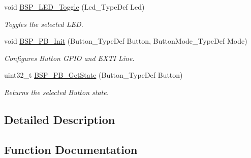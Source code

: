 \begin{DoxyCompactItemize}
void \mbox{\hyperlink{group___s_t_m32_f4___d_i_s_c_o_v_e_r_y___l_o_w___l_e_v_e_l___exported___functions_ga1b9eabba7d498f41d6f16587ec0f9732}{B\+S\+P\+\_\+\+L\+E\+D\+\_\+\+Toggle}} (Led\+\_\+\+Type\+Def Led)
\begin{DoxyCompactList}\small\item\em Toggles the selected L\+ED. \end{DoxyCompactList}\item 
void \mbox{\hyperlink{group___s_t_m32_f4___d_i_s_c_o_v_e_r_y___l_o_w___l_e_v_e_l___exported___functions_gaeece1cd3a2156a50bfa81638a27a1143}{B\+S\+P\+\_\+\+P\+B\+\_\+\+Init}} (Button\+\_\+\+Type\+Def Button, Button\+Mode\+\_\+\+Type\+Def Mode)
\begin{DoxyCompactList}\small\item\em Configures Button G\+P\+IO and E\+X\+TI Line. \end{DoxyCompactList}\item 
uint32\+\_\+t \mbox{\hyperlink{group___s_t_m32_f4___d_i_s_c_o_v_e_r_y___l_o_w___l_e_v_e_l___exported___functions_ga8f0978b6cffda9c67266ddfdb3a0abf7}{B\+S\+P\+\_\+\+P\+B\+\_\+\+Get\+State}} (Button\+\_\+\+Type\+Def Button)
\begin{DoxyCompactList}\small\item\em Returns the selected Button state. \end{DoxyCompactList}\end{DoxyCompactItemize}


\subsection{Detailed Description}


\subsection{Function Documentation}
\mbox{\label{group___s_t_m32_f4___d_i_s_c_o_v_e_r_y___l_o_w___l_e_v_e_l___exported___functions_ga65d13608f7010a8068614154cb142cd6}} 
